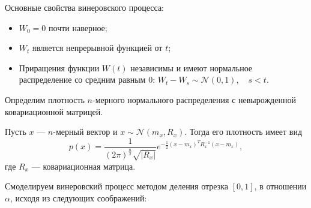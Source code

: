 Основные свойства винеровского процесса:
\begin{itemize}
	\item $W_0=0$ почти наверное;
	\item $W_t$ является непрерывной функцией от $t$;
	\item Приращения функции $W(t)$ независимы и имеют нормальное 
     распределение со средним равным 0: $W_t - W_s \sim \mathcal{N} (0,1), 
     \quad s < t $.
\end{itemize}
Определим плотность $n$-мерного нормального распределения с невырожденной 
 ковариационной матрицей.
\begin{definition}
	Пусть $x$ --- $n$-мерный вектор и $ x \sim \mathcal{N}(m_x, R_x) $. 
     Тогда его плотность имеет вид
	\[
	 p(x) = \dfrac{1}{(2\pi)^{\frac{n}{2}}\sqrt{|R_x|}}e^ {-\frac{1}{2}
     (x-m_x)^T R_x^{-1}(x-m_x)},
	\]
	где $R_x$ --- ковариационная матрица.
\end{definition}
Смоделируем винеровский процесс методом деления отрезка $[0,1]$, в 
 отношении $\alpha$, исходя из следующих соображений:
